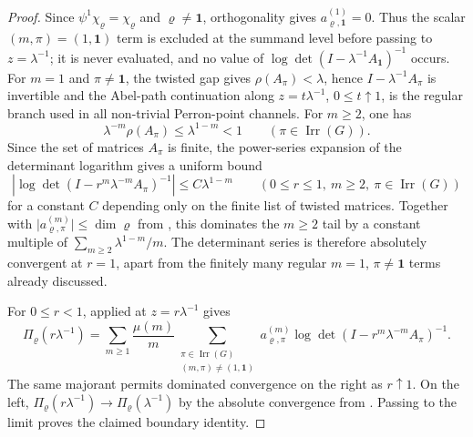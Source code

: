 \documentclass[11pt,a4paper]{amsart}
\theoremstyle{plain}
\theoremstyle{definition}
\theoremstyle{remark}
\DeclareMathOperator{\Irr}{Irr}
\newcommand{\abs}[1]{\lvert #1 \rvert}
\begin{document}
\begin{proof}
  Since \(\psi^1\chi_\varrho=\chi_\varrho\) and
  \(\varrho\neq\mathbf 1\), orthogonality gives
  \(a_{\varrho,\mathbf 1}^{(1)}=0\). Thus the scalar
  \((m,\pi)=(1,\mathbf1)\) term is excluded at the summand level before
  passing to \(z=\lambda^{-1}\); it is never evaluated, and no value of
  \(\log\det(I-\lambda^{-1}A_{\mathbf 1})^{-1}\) occurs. For
  \(m=1\) and \(\pi\neq\mathbf 1\), the twisted gap gives
  \(\rho(A_\pi)<\lambda\), hence \(I-\lambda^{-1}A_\pi\) is
  invertible and the Abel-path continuation along
  \(z=t\lambda^{-1}\), \(0\le t\uparrow1\), is the regular branch used in
  all non-trivial Perron-point channels. For
  \(m\ge2\), one has
  \[
    \lambda^{-m}\rho(A_\pi)\le \lambda^{1-m}<1
    \qquad(\pi\in\Irr(G)).
  \]
  Since the set of matrices \(A_\pi\) is finite, the power-series
  expansion of the determinant logarithm gives a uniform bound
  \[
    \left|\log\det(I-r^m\lambda^{-m}A_\pi)^{-1}\right|
    \le C\lambda^{1-m}
    \qquad(0\le r\le1,\ m\ge2,\ \pi\in\Irr(G))
  \]
  for a constant \(C\) depending only on the finite list of twisted
  matrices. Together with
  \(\abs{a_{\varrho,\pi}^{(m)}}\le\dim\varrho\) from
  , this dominates the \(m\ge2\)
  tail by a constant multiple of
  \(\sum_{m\ge2}\lambda^{1-m}/m\). The determinant series is therefore
  absolutely convergent at \(r=1\), apart from the finitely many regular
  \(m=1\), \(\pi\neq\mathbf1\) terms already discussed.

  For \(0\le r<1\),  applied
  at \(z=r\lambda^{-1}\) gives
  \[
    \Pi_\varrho(r\lambda^{-1})
    =
    \sum_{m\ge 1}\frac{\mu(m)}{m}
      \sum_{\substack{\pi\in\Irr(G)\\(m,\pi)\neq(1,\mathbf 1)}}
        a_{\varrho,\pi}^{(m)}
        \log\det(I-r^m\lambda^{-m}A_\pi)^{-1}.
  \]
  The same majorant permits dominated convergence on the right as
  \(r\uparrow1\). On the left,
  \(\Pi_\varrho(r\lambda^{-1})\to\Pi_\varrho(\lambda^{-1})\) by the
  absolute convergence from
  . Passing to the limit
  proves the claimed boundary identity.
\end{proof}
\end{document}
